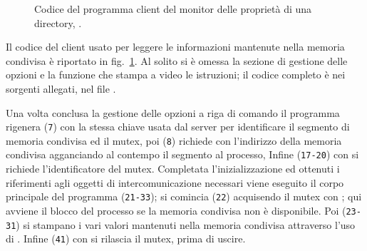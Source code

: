 \begin{figure}[!htbp]
  \footnotesize \centering
  \begin{minipage}[c]{\codesamplewidth}
  \end{minipage} 
  \normalsize 
  \caption{Codice del programma client del monitor delle proprietà di una
    directory, .}
  \label{fig:ipc_dirmonitor_client}
\end{figure}

Il codice del client usato per leggere le informazioni mantenute nella memoria
condivisa è riportato in fig.~\ref{fig:ipc_dirmonitor_client}. Al solito si è
omessa la sezione di gestione delle opzioni e la funzione che stampa a video
le istruzioni; il codice completo è nei sorgenti allegati, nel file
.

Una volta conclusa la gestione delle opzioni a riga di comando il programma
rigenera (\texttt{\small 7}) con  la stessa chiave usata dal server
per identificare il segmento di memoria condivisa ed il mutex, poi
(\texttt{\small 8}) richiede con  l'indirizzo della memoria
condivisa agganciando al contempo il segmento al processo, Infine
(\texttt{\small 17-20}) con  si richiede l'identificatore del
mutex.  Completata l'inizializzazione ed ottenuti i riferimenti agli oggetti
di intercomunicazione necessari viene eseguito il corpo principale del
programma (\texttt{\small 21-33}); si comincia (\texttt{\small 22})
acquisendo il mutex con ; qui avviene il blocco del processo
se la memoria condivisa non è disponibile.  Poi (\texttt{\small 23-31}) si
stampano i vari valori mantenuti nella memoria condivisa attraverso l'uso di
.  Infine (\texttt{\small 41}) con  si rilascia
il mutex, prima di uscire.

